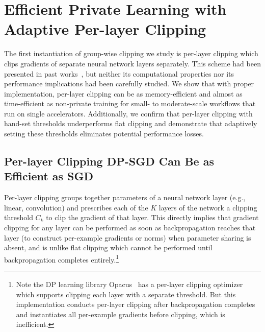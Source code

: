 


\section[Efficient Private Learning with Adaptive Per-layer Clipping]{Efficient Private Learning with \\Adaptive Per-layer Clipping} \label{sec:benefit-loss}
The first instantiation of group-wise clipping we study is per-layer clipping which clips gradients of separate neural network layers separately.
This scheme had been presented in past works~\citep{mcmahan2018general,mcmahan2018learning,dupuy2022efficient},
but neither its computational properties nor its performance implications had been carefully studied.
We show that with proper implementation, per-layer clipping can be as memory-efficient and almost as time-efficient as non-private training for small- to moderate-scale workflows that run on single accelerators.
Additionally, we confirm that per-layer clipping with hand-set thresholds underperforms flat clipping and demonstrate that adaptively setting these thresholds eliminates potential performance losses. 


\subsection[Per-layer Clipping DP-SGD Can Be Almost as Efficient as Non-private SGD]{Per-layer Clipping DP-SGD Can Be as Efficient as SGD}
Per-layer clipping groups together parameters of a neural network layer (e.g., linear, convolution) and prescribes each of the $K$ layers of the network a clipping threshold $C_k$ to clip the gradient of that layer. This directly implies that gradient clipping for any layer can be performed as soon as backpropagation reaches that layer (to construct per-example gradients or norms) when parameter sharing is absent, and is unlike flat clipping which cannot be performed until backpropagation completes entirely.\footnote{Note the DP learning library Opacus~\citep{yousefpour2021opacus} has a per-layer clipping optimizer which supports clipping each layer with a separate threshold. But this implementation conducts per-layer clipping after backpropagation completes and instantiates all per-example gradients before clipping, which is inefficient.
}

